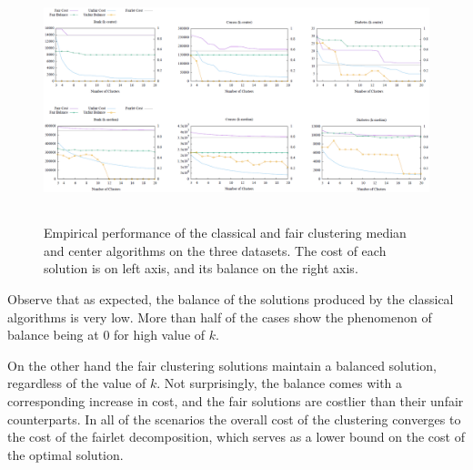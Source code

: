 \begin{figure}[hbt!]
\centering
  \includegraphics[height=7cm]{experiments/fig/fig4.png}
  \caption{Empirical performance of the classical and fair clustering median and center algorithms on the three datasets. The cost of each solution is on left axis, and its balance on the right axis.}
\end{figure}

Observe that as expected, the balance of the solutions produced by the classical algorithms is very low. More than half of the cases show the phenomenon of balance being at 0 for high value of $k$.

On the other hand the fair clustering solutions maintain a balanced solution, regardless of the value of $k$. Not surprisingly, the balance comes with a corresponding increase in cost, and the fair solutions are costlier than
their unfair counterparts.
In all of the scenarios the overall cost of the clustering converges
to the cost of the fairlet decomposition, which serves as a lower bound on the cost of the optimal solution.